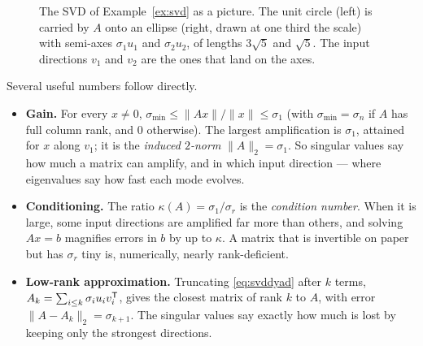 \documentclass[11pt]{article}
\begin{document}
\begin{figure}[htb]
\centering
{}
\caption{The SVD of Example~\ref{ex:svd} as a picture. The unit circle (left) is
carried by $A$ onto an ellipse (right, drawn at one third the scale) with semi-axes
$\sigma_1u_1$ and $\sigma_2u_2$, of lengths $3\sqrt5$ and $\sqrt5$. The input
directions $v_1$ and $v_2$ are the ones that land on the axes.}
\label{fig:svd}
\end{figure}

Several useful numbers follow directly.
\begin{itemize}[leftmargin=*,itemsep=2pt]
\item \textbf{Gain.} For every $x\neq0$,
$\sigma_{\min}\le\|Ax\|/\|x\|\le\sigma_1$ (with $\sigma_{\min}=\sigma_n$ if
$A$ has full column rank, and $0$ otherwise). The largest amplification is
$\sigma_1$, attained for $x$ along $v_1$; it is the \emph{induced $2$-norm}
$\|A\|_2=\sigma_1$. So singular values say how much a matrix can amplify, and in
which input direction --- where eigenvalues say how fast each mode evolves.
\item \textbf{Conditioning.} The ratio $\kappa(A)=\sigma_1/\sigma_r$ is the
\emph{condition number}. When it is large, some input directions are amplified far
more than others, and solving $Ax=b$ magnifies errors in $b$ by up to $\kappa$. A
matrix that is invertible on paper but has $\sigma_r$ tiny is, numerically, nearly
rank-deficient.
\item \textbf{Low-rank approximation.} Truncating \eqref{eq:svddyad} after $k$
terms, $A_k=\sum_{i\le k}\sigma_iu_iv_i^{\mathsf{T}}$, gives the closest matrix of rank $k$
to $A$, with error $\|A-A_k\|_2=\sigma_{k+1}$. The singular values say exactly how
much is lost by keeping only the strongest directions.
\end{itemize}
\end{document}
